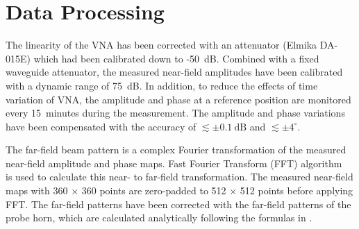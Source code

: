 \documentclass[journal]{IEEEtran}
\begin{document}
\section{Data Processing}
%
%
The linearity of the VNA has been corrected with an attenuator (Elmika DA-015E) which had been calibrated down to -50~dB. 
Combined with a fixed waveguide attenuator, the measured near-field amplitudes have been calibrated with a dynamic range of 75~dB.
%
In addition, to reduce the effects of time variation of VNA, the amplitude and phase at a reference position are monitored every 15~minutes during the measurement. The amplitude and phase variations have been compensated with the accuracy of $\lesssim \pm 0.1 \ \mathrm{dB}$ and $\lesssim \pm 4^\circ$.
%
\par
The far-field beam pattern is a complex Fourier transformation of the measured near-field amplitude and phase maps. Fast Fourier Transform (FFT) algorithm~\cite{Cooley1965} is used to calculate this near- to far-field transformation. The measured near-field maps with 360 $\times$ 360 points are zero-padded to 512 $\times$ 512 points before applying FFT.
%
%
The far-field patterns have been corrected with the far-field patterns of the probe horn, which are calculated analytically following the formulas in \cite{Yaghjian1984}. 
%
%
\end{document}

